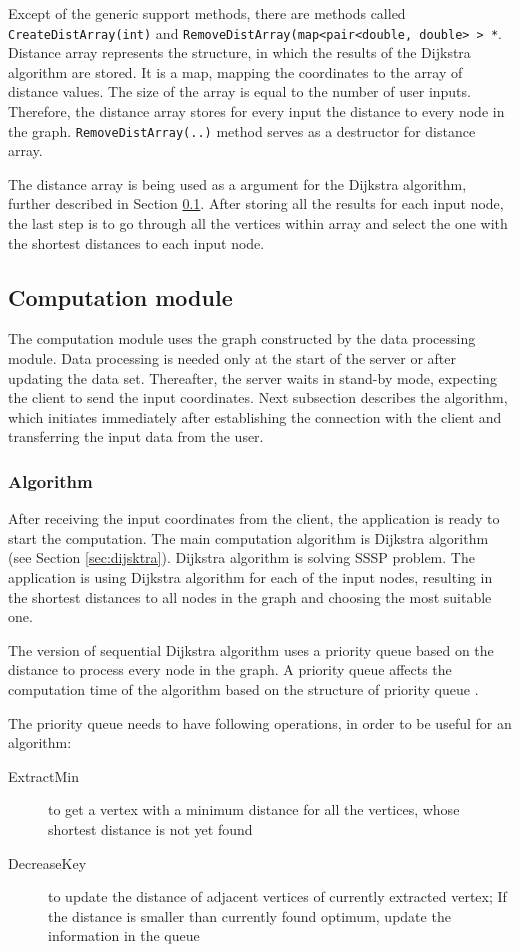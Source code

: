 \documentclass[thesis=M,english]{FITthesis}[2012/10/20]
\begin{document}
Except of the generic support methods, there are methods called \texttt{CreateDistArray(int)} and \texttt{RemoveDistArray(map<pair<double, double> > *}. Distance array represents the structure, in which the results of the Dijkstra algorithm are stored. It is a map, mapping the coordinates to the array of distance values. The size of the array is equal to the number of user inputs. Therefore, the distance array stores for every input the distance to every node in the graph. 
\texttt{RemoveDistArray(..)} method serves as a destructor for distance array.

The distance array is being used as a argument for the Dijkstra algorithm, further described in Section \ref{subsec:server_comp}. After storing all the results for each input node, the last step is to go through all the vertices within array and select the one with the shortest distances to each input node.


\subsection{Computation module}
\label{subsec:server_comp}
The computation module uses the graph constructed by the data processing module. Data processing is needed only at the start of the server or after updating the data set. Thereafter, the server waits in stand-by mode, expecting the client to send the input coordinates. Next subsection describes the algorithm, which initiates immediately after establishing the connection with the client and transferring the input data from the user.


\subsubsection{Algorithm}
\label{subsec:alg}
After receiving the input coordinates from the client, the application is ready to start the computation. 
The main computation algorithm is Dijkstra algorithm (see Section \ref{sec:dijsktra}). Dijkstra algorithm is solving SSSP problem. The application is using Dijkstra algorithm for each of the input nodes, resulting in the shortest distances to all nodes in the graph and choosing the most suitable one.

The version of sequential Dijkstra algorithm uses a priority queue based on the distance to process every node in the graph. A priority queue affects the computation time of the algorithm based on the structure of priority queue \cite{Chen07}. 

The priority queue needs to have following operations, in order to be useful for an algorithm:
\begin{description}

\item[ExtractMin] to get a vertex with a minimum distance for all the vertices, whose shortest distance is not yet found
\item[DecreaseKey] to update the distance of adjacent vertices of currently	extracted vertex; If the distance is smaller than currently found optimum, update the information in the queue

\end{description}
\end{document}
